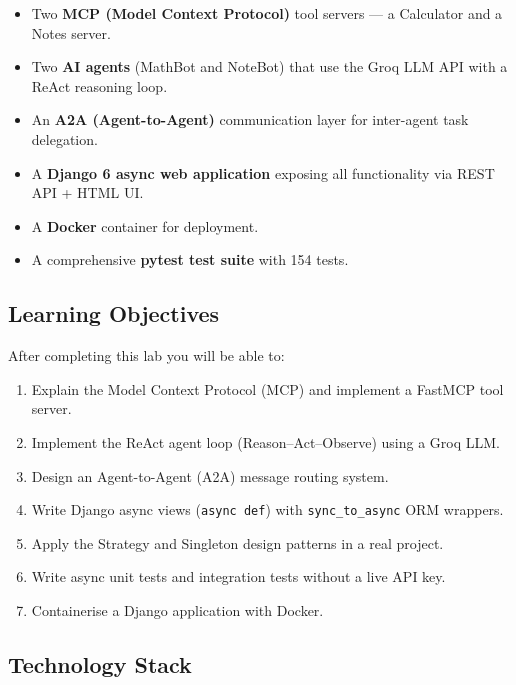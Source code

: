 \documentclass[11pt,a4paper]{article}
\begin{document}
\begin{itemize}[leftmargin=*]
  \item Two \textbf{MCP (Model Context Protocol)} tool servers — a Calculator and a Notes server.
  \item Two \textbf{AI agents} (MathBot and NoteBot) that use the Groq LLM API with a ReAct reasoning loop.
  \item An \textbf{A2A (Agent-to-Agent)} communication layer for inter-agent task delegation.
  \item A \textbf{Django 6 async web application} exposing all functionality via REST API + HTML UI.
  \item A \textbf{Docker} container for deployment.
  \item A comprehensive \textbf{pytest test suite} with 154 tests.
\end{itemize}

\subsection{Learning Objectives}

After completing this lab you will be able to:

\begin{enumerate}[leftmargin=*]
  \item Explain the Model Context Protocol (MCP) and implement a FastMCP tool server.
  \item Implement the ReAct agent loop (Reason–Act–Observe) using a Groq LLM.
  \item Design an Agent-to-Agent (A2A) message routing system.
  \item Write Django async views (\texttt{async def}) with \texttt{sync\_to\_async} ORM wrappers.
  \item Apply the Strategy and Singleton design patterns in a real project.
  \item Write async unit tests and integration tests without a live API key.
  \item Containerise a Django application with Docker.
\end{enumerate}

\subsection{Technology Stack}
\end{document}
